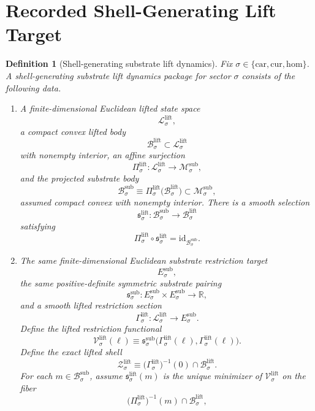 \documentclass[11pt]{article}
\newcommand{\Car}{\mathrm{car}}
\newcommand{\Cur}{\mathrm{cur}}
\newcommand{\Hom}{\mathrm{hom}}
\newcommand{\SubSpace}[1]{\mathcal M_{#1}^{\mathrm{sub}}}
\newcommand{\SubBody}[1]{\mathcal B_{#1}^{\mathrm{sub}}}
\newcommand{\SubTarget}[1]{E_{#1}^{\mathrm{sub}}}
\newcommand{\SubPair}[1]{\mathfrak s_{#1}^{\mathrm{sub}}}
\newcommand{\LiftSpace}[1]{\mathcal L_{#1}^{\mathrm{lift}}}
\newcommand{\LiftBody}[1]{\mathcal B_{#1}^{\mathrm{lift}}}
\newcommand{\LiftProj}[1]{\Pi_{#1}^{\mathrm{lift}}}
\newcommand{\LiftSelect}[1]{\mathfrak s_{#1}^{\mathrm{lift}}}
\newcommand{\LiftSection}[1]{\Gamma_{#1}^{\mathrm{lift}}}
\newcommand{\LiftFunctional}[1]{\mathscr V_{#1}^{\mathrm{lift}}}
\newcommand{\LiftShellSet}[1]{\mathcal Z_{#1}^{\mathrm{lift}}}
\newtheorem{definition}{Definition}
\begin{document}
\section{Recorded Shell-Generating Lift Target}

\begin{definition}[Shell-generating substrate lift dynamics]
\label{def:lift}
Fix \(\sigma\in\{\Car,\Cur,\Hom\}\). A \emph{shell-generating substrate lift dynamics package} for sector \(\sigma\) consists of the following data.
\begin{enumerate}
    \item A finite-dimensional Euclidean lifted state space
    \[
    \LiftSpace{\sigma},
    \]
    a compact convex lifted body
    \[
    \LiftBody{\sigma}\subset\LiftSpace{\sigma}
    \]
    with nonempty interior, an affine surjection
    \[
    \LiftProj{\sigma}:\LiftSpace{\sigma}\to\SubSpace{\sigma},
    \]
    and the projected substrate body
    \[
    \SubBody{\sigma}
    \equiv
    \LiftProj{\sigma}\bigl(\LiftBody{\sigma}\bigr)
    \subset \SubSpace{\sigma},
    \]
    assumed compact convex with nonempty interior. There is a smooth selection
    \[
    \LiftSelect{\sigma}:\SubBody{\sigma}\to\LiftBody{\sigma}
    \]
    satisfying
    \[
    \LiftProj{\sigma}\circ\LiftSelect{\sigma}
    =
    \mathrm{id}_{\SubBody{\sigma}}.
    \]
    \item The same finite-dimensional Euclidean substrate restriction target
    \[
    \SubTarget{\sigma},
    \]
    the same positive-definite symmetric substrate pairing
    \[
    \SubPair{\sigma}:
    \SubTarget{\sigma}\times\SubTarget{\sigma}\to\mathbb R,
    \]
    and a smooth lifted restriction section
    \[
    \LiftSection{\sigma}:\LiftSpace{\sigma}\to\SubTarget{\sigma}.
    \]
    Define the lifted restriction functional
    \begin{equation}
    \LiftFunctional{\sigma}(\ell)
    \equiv
    \SubPair{\sigma}\bigl(\LiftSection{\sigma}(\ell),\LiftSection{\sigma}(\ell)\bigr).
    \label{eq:liftfunctional}
    \end{equation}
    Define the exact lifted shell
    \begin{equation}
    \LiftShellSet{\sigma}
    \equiv
    \bigl(\LiftSection{\sigma}\bigr)^{-1}(0)\cap\LiftBody{\sigma}.
    \label{eq:liftshell}
    \end{equation}
    For each \(m\in\SubBody{\sigma}\), assume \(\LiftSelect{\sigma}(m)\) is the unique minimizer of \(\LiftFunctional{\sigma}\) on the fiber
    \[
    \bigl(\LiftProj{\sigma}\bigr)^{-1}(m)\cap\LiftBody{\sigma},
\]
\end{enumerate}
\end{definition}
\end{document}

